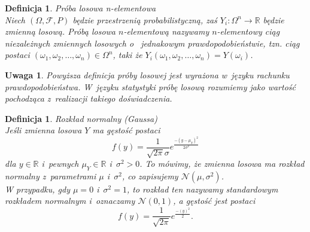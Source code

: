 \documentclass[12pt,a4paper]{report}
\newtheorem{definition}[theorem]{Definicja}
\newtheorem{uwaga}{Uwaga}
\begin{document}
\begin{definition}{Próba losowa n-elementowa \cite[Rozdział 2]{bartoszewicz1996}}\\
Niech $(\Omega, \mathcal{F}, P)$ będzie przestrzenią probabilistyczną, zaś $Y_{i}:\Omega^{n}  \rightarrow \mathbb{R}$ będzie zmienną losową.  
Próbą losowa $n$-elementową nazywamy $n$-elementowy ciąg niezależnych zmiennych losowych o~ jednakowym prawdopodobieństwie, tzn. ciąg postaci $(\omega_{1}, \omega_{2}, \ldots, \omega_{n}) \in \Omega^{n}$, taki że $Y_{i}(\omega_{1}, \omega_{2}, \ldots, \omega_{n})=Y(\omega_{i})$.
\end{definition}


\begin{uwaga}
Powyższa definicja próby losowej jest wyrażona w~języku rachunku prawdopodobieństwa. W~języku statystyki próbę losową rozumiemy jako wartość pochodząca z~realizacji takiego doświadczenia.
\end{uwaga}



\begin{definition}{Rozkład normalny (Gaussa) \cite[Rozdział 5.10]{jakubowski2004}}\\
Jeśli zmienna losowa $Y$ ma gęstość postaci
$$
f(y)=\frac{1}{\sqrt{2\pi}\sigma}e^\frac{-(y-\mu_Y)^2}{2\sigma^2}
$$ 
dla $y \in \mathbb{R}$ i~pewnych $\mu_Y \in \mathbb{R}$ i~$\sigma^2 >0$. To mówimy, że zmienna losowa ma rozkład normalny z~parametrami $\mu$ i~$\sigma^2$, co zapisujemy $\mathcal{N}(\mu, \sigma^2)$.\\
W przypadku, gdy $\mu=0$ i~$\sigma^2=1$, to rozkład ten nazywamy standardowym rozkładem normalnym i~oznaczamy $\mathcal{N}(0,1)$, a gęstość jest postaci
$$f(y)=\frac{1}{\sqrt{2\pi}}e^\frac{-(y)^2}{2}.$$ 
\end{definition}


\end{document}
